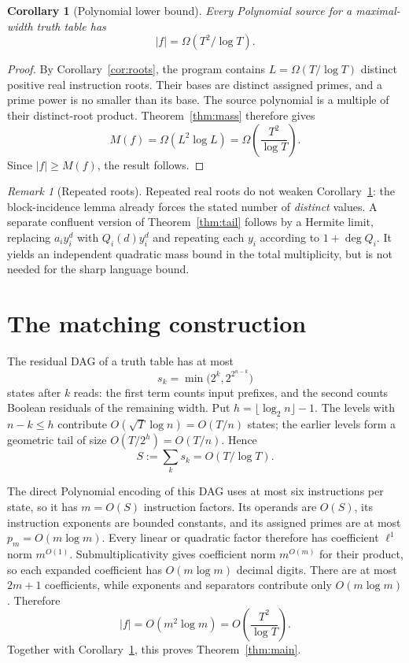 \documentclass[11pt]{article}
\newtheorem{corollary}[theorem]{Corollary}
\theoremstyle{definition}
\theoremstyle{remark}
\newtheorem{remark}[theorem]{Remark}
\begin{document}
\begin{corollary}[Polynomial lower bound]\label{cor:lower}
Every Polynomial source for a maximal-width truth table has
\[
  |f|=\Omega(T^2/\log T).
\]
\end{corollary}

\begin{proof}
By Corollary~\ref{cor:roots}, the program contains
$L=\Omega(T/\log T)$ distinct positive real instruction roots.  Their
bases are distinct assigned primes, and a prime power is no smaller than its
base.  The source polynomial is a multiple of their distinct-root product.
Theorem~\ref{thm:mass} therefore gives
\[
 M(f)=\Omega(L^2\log L)
     =\Omega\!\left(\frac{T^2}{\log T}\right).
\]
Since $|f|\ge M(f)$, the result follows.
\end{proof}

\begin{remark}[Repeated roots]
Repeated real roots do not weaken Corollary~\ref{cor:lower}: the
block-incidence lemma already forces the stated number of \emph{distinct}
values.  A separate confluent version of Theorem~\ref{thm:tail} follows by a
Hermite limit, replacing $a_iy_i^d$ with $Q_i(d)y_i^d$ and repeating each
$y_i$ according to $1+\deg Q_i$.  It yields an independent quadratic mass
bound in the total multiplicity, but is not needed for the sharp language
bound.
\end{remark}

\section{The matching construction}\label{sec:upper}

The residual DAG of a truth table has at most
\[
  s_k=\min\bigl(2^k,2^{2^{n-k}}\bigr)
\]
states after $k$ reads: the first term counts input prefixes, and the second
counts Boolean residuals of the remaining width.  Put
$h=\lfloor\log_2 n\rfloor-1$.  The levels with $n-k\le h$ contribute
$O(\sqrt T\log n)=O(T/n)$ states; the earlier levels form a geometric tail
of size $O(T/2^h)=O(T/n)$.  Hence
\[
  S:=\sum_k s_k=O(T/\log T).
\]

The direct Polynomial encoding of this DAG uses at most six instructions per
state, so it has $m=O(S)$ instruction factors.  Its operands are $O(S)$,
its instruction exponents are bounded constants, and its assigned primes are
at most $p_m=O(m\log m)$.  Every linear or quadratic factor therefore has
coefficient $\ell^1$ norm $m^{O(1)}$.  Submultiplicativity gives coefficient
norm $m^{O(m)}$ for their product, so each expanded coefficient has
$O(m\log m)$ decimal digits.  There are at most $2m+1$ coefficients, while
exponents and separators contribute only $O(m\log m)$.  Therefore
\[
  |f|=O(m^2\log m)
      =O\!\left(\frac{T^2}{\log T}\right).
\]
Together with Corollary~\ref{cor:lower}, this proves
Theorem~\ref{thm:main}.
\end{document}
